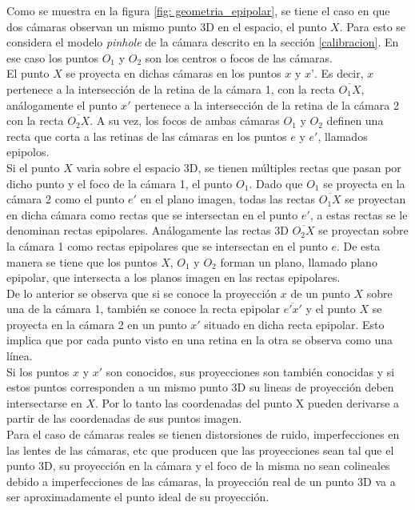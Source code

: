  Como se muestra en la figura \ref{fig: geometria_epipolar}, se tiene el caso en que dos cámaras observan un mismo punto 3D en el espacio, el punto $X$. Para esto se considera el modelo \textit{pinhole} de la cámara  descrito en la sección \ref{calibracion}. En ese caso los puntos $O_1$ y $O_2$ son los centros o focos de las cámaras.\\
 
  El punto $X$ se proyecta en dichas cámaras en los puntos $x$ y $x’$. Es decir, $x$ pertenece a la intersección de la retina de la cámara 1, con la recta $\overline{O_1X}$, análogamente el punto $x'$ pertenece a la intersección de la retina de la cámara 2 con la recta $\overline{O_2X}$. A su vez, los focos de ambas cámaras $O_1$ y $O_2$ definen una recta que corta a las retinas de las cámaras en los puntos $e$ y $e'$, llamados epipolos.\\
  
  Si el punto $X$ varia sobre el espacio 3D, se tienen múltiples rectas que pasan por dicho punto y el foco de la cámara 1, el punto $O_1$. Dado que $O_1$ se proyecta en la cámara 2 como el punto $e'$ en el plano imagen, todas las rectas  $\overline{O_1X}$ se proyectan en dicha cámara como rectas que se intersectan en el punto $e'$, a estas rectas se le denominan rectas epipolares. Análogamente las rectas 3D $\overline{O_2X}$ se proyectan sobre la cámara 1 como rectas epipolares que se intersectan en el punto $e$. De esta manera se tiene que los puntos $X$, $O_1$ y $O_2$ forman un plano, llamado plano epipolar,  que intersecta a los planos imagen en las rectas epipolares.\\
  
De lo anterior se observa que si se conoce la proyección $x$ de un punto $X$ sobre una de la cámara 1, también se conoce la recta epipolar $\overline{e'x'}$ y el punto $X$ se proyecta en la cámara 2 en un punto $x'$ situado en dicha recta epipolar. Esto implica que por cada punto visto en una retina en la otra se observa como una línea.\\
 
Si los puntos $x$ y $x'$ son conocidos, sus proyecciones son también conocidas y si estos puntos corresponden a un mismo punto 3D su lineas de proyección deben intersectarse en $X$. Por lo tanto las coordenadas del punto X pueden derivarse a partir de las coordenadas de sus puntos imagen.\\
 
Para el caso de cámaras reales se tienen distorsiones de ruido, imperfecciones en las lentes de las cámaras, etc que producen que las proyecciones sean tal que el punto 3D, su proyección en la cámara y el foco de la misma no sean colineales debido a imperfecciones de las cámaras, la proyección real de un punto 3D va a ser aproximadamente el punto ideal de su proyección. \\

